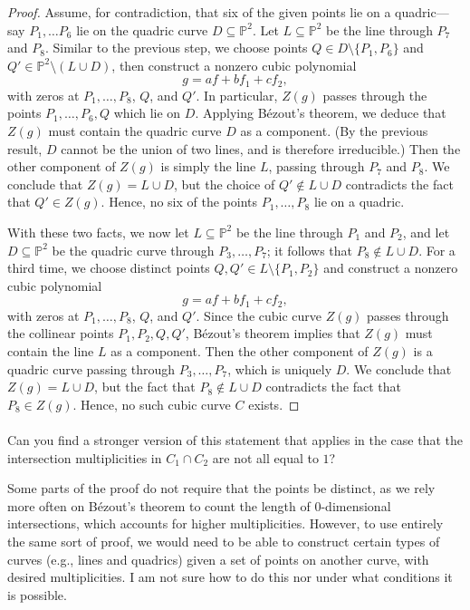 \documentclass[12pt]{article}
\newlength{\myparskip}
\newenvironment{fullbox}{\begin{lrbox}{\savefullbox}\begin{minipage}{\dimexpr\textwidth-2\fboxsep\relax}\setlength{\parskip}{\myparskip}}{\end{minipage}\end{lrbox}\framebox[\textwidth]{\usebox{\savefullbox}}}
\newenvironment{pbox}[1][]{\begin{fullbox}\ifx#1\empty\else\paragraph{#1}\phantom{}\fi}{\end{fullbox}}
\theoremstyle{definition}
\renewcommand{\P}{\mathbb{P}}
\newcommand{\<}{\langle}
\renewcommand{\>}{\rangle}
\newcommand{\seq}{\subseteq}
\begin{document}
\begin{proof}
    Assume, for contradiction, that six of the given points lie on a quadric---say $P_1, \dots P_6$ lie on the quadric curve $D \seq \P^2$.
    Let $L \seq \P^2$ be the line through $P_7$ and $P_8$.
    Similar to the previous step, we choose points $Q \in D \setminus \{P_1, P_6\}$ and $Q' \in \P^2 \setminus (L \cup D)$, then construct a nonzero cubic polynomial
    \[
        g = af + bf_1 + cf_2,
    \]
    with zeros at $P_1, \dots, P_8$, $Q$, and $Q'$.
    In particular, $Z(g)$ passes through the points $P_1, \dots, P_6, Q$ which lie on $D$.
    Applying B\'ezout's theorem, we deduce that $Z(g)$ must contain the quadric curve $D$ as a component.
    (By the previous result, $D$ cannot be the union of two lines, and is therefore irreducible.)
    Then the other component of $Z(g)$ is simply the line $L$, passing through $P_7$ and $P_8$.
    We conclude that $Z(g) = L \cup D$, but the choice of $Q' \notin L \cup D$ contradicts the fact that $Q' \in Z(g)$.
    Hence, no six of the points $P_1, \dots, P_8$ lie on a quadric.

    With these two facts, we now let $L \seq \P^2$ be the line through $P_1$ and $P_2$, and let $D \seq \P^2$ be the quadric curve through $P_3, \dots, P_7$; it follows that $P_8 \notin L \cup D$.
    For a third time, we choose distinct points $Q, Q' \in L \setminus \{P_1, P_2\}$ and construct a nonzero cubic polynomial
    \[
        g = af + bf_1 + cf_2,
    \]
    with zeros at $P_1, \dots, P_8$, $Q$, and $Q'$.
    Since the cubic curve $Z(g)$ passes through the collinear points $P_1, P_2, Q, Q'$, B\'ezout's theorem implies that $Z(g)$ must contain the line $L$ as a component.
    Then the other component of $Z(g)$ is a quadric curve passing through $P_3, \dots, P_7$, which is uniquely $D$.
    We conclude that $Z(g) = L \cup D$, but the fact that $P_8 \notin L \cup D$ contradicts the fact that $P_8 \in Z(g)$.
    Hence, no such cubic curve $C$ exists.
\end{proof}


\begin{pbox}
    Can you find a stronger version of this statement that applies in the case that the intersection multiplicities in $C_1 \cap C_2$ are not all equal to $1$?
\end{pbox}

Some parts of the proof do not require that the points be distinct, as we rely more often on B\'ezout's theorem to count the length of $0$-dimensional intersections, which accounts for higher multiplicities.
However, to use entirely the same sort of proof, we would need to be able to construct certain types of curves (e.g., lines and quadrics) given a set of points on another curve, with desired multiplicities.
I am not sure how to do this nor under what conditions it is possible.
\end{document}
